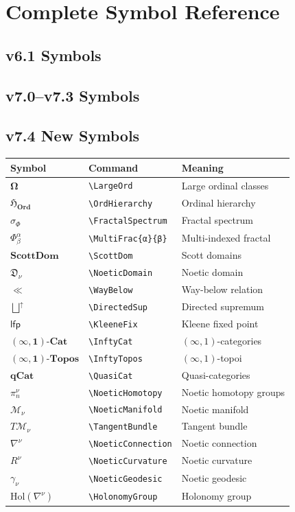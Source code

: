 \documentclass[11pt,twoside,openright]{book}
\theoremstyle{definition}
\theoremstyle{plain}
\theoremstyle{remark}
\newcommand{\Ord}{\mathbf{Ord}}              %
\newcommand{\LargeOrd}{\boldsymbol{\Omega}}          %
\newcommand{\OrdHierarchy}{\mathfrak{H}_{\Ord}}      %
\newcommand{\FractalSpectrum}{\sigma_\Phi}           %
\newcommand{\MultiFrac}[2]{\Phi^{#1}_{#2}}           %
\newcommand{\ScottDom}{\mathbf{ScottDom}}            %
\newcommand{\NoeticDomain}{\mathfrak{D}_\nu}         %
\newcommand{\WayBelow}{\ll}                          %
\newcommand{\DirectedSup}{\bigsqcup^{\uparrow}}      %
\newcommand{\KleeneFix}{\mathsf{lfp}}                %
\newcommand{\InftyCat}{\mathbf{(\infty,1)\text{-}Cat}}  %
\newcommand{\InftyTopos}{\mathbf{(\infty,1)\text{-}Topos}} %
\newcommand{\QuasiCat}{\mathbf{qCat}}                %
\newcommand{\NoeticHomotopy}{\pi^{\nu}_n}            %
\newcommand{\NoeticManifold}{\mathcal{M}_\nu}        %
\newcommand{\TangentBundle}{T\mathcal{M}_\nu}        %
\newcommand{\NoeticConnection}{\nabla^\nu}           %
\newcommand{\NoeticCurvature}{R^\nu}                 %
\newcommand{\NoeticGeodesic}{\gamma_\nu}             %
\newcommand{\HolonomyGroup}{\mathrm{Hol}(\nabla^\nu)} %
\begin{document}
\chapter{Complete Symbol Reference}
\label{ch:symbol-reference}

\section{v6.1 Symbols}

\section{v7.0--v7.3 Symbols}

\section{v7.4 New Symbols}

\begin{center}
\begin{longtable}{lll}
\toprule
\textbf{Symbol} & \textbf{Command} & \textbf{Meaning} \\
\midrule
\endhead
$\LargeOrd$ & \verb|\LargeOrd| & Large ordinal classes \\
$\OrdHierarchy$ & \verb|\OrdHierarchy| & Ordinal hierarchy \\
$\FractalSpectrum$ & \verb|\FractalSpectrum| & Fractal spectrum \\
$\MultiFrac{\alpha}{\beta}$ & \verb|\MultiFrac{α}{β}| & Multi-indexed fractal \\
$\ScottDom$ & \verb|\ScottDom| & Scott domains \\
$\NoeticDomain$ & \verb|\NoeticDomain| & Noetic domain \\
$\WayBelow$ & \verb|\WayBelow| & Way-below relation \\
$\DirectedSup$ & \verb|\DirectedSup| & Directed supremum \\
$\KleeneFix$ & \verb|\KleeneFix| & Kleene fixed point \\
$\InftyCat$ & \verb|\InftyCat| & $(\infty,1)$-categories \\
$\InftyTopos$ & \verb|\InftyTopos| & $(\infty,1)$-topoi \\
$\QuasiCat$ & \verb|\QuasiCat| & Quasi-categories \\
$\NoeticHomotopy$ & \verb|\NoeticHomotopy| & Noetic homotopy groups \\
$\NoeticManifold$ & \verb|\NoeticManifold| & Noetic manifold \\
$\TangentBundle$ & \verb|\TangentBundle| & Tangent bundle \\
$\NoeticConnection$ & \verb|\NoeticConnection| & Noetic connection \\
$\NoeticCurvature$ & \verb|\NoeticCurvature| & Noetic curvature \\
$\NoeticGeodesic$ & \verb|\NoeticGeodesic| & Noetic geodesic \\
$\HolonomyGroup$ & \verb|\HolonomyGroup| & Holonomy group \\
\bottomrule
\end{longtable}
\end{center}
\end{document}
